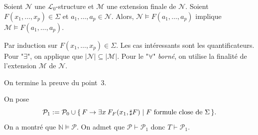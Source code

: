 \documentclass[./main]{subfiles}
\begin{document}
 \begin{lem}
   Soient $\mathcal{N}$ une $\mathcal{L}_0$-structure et $\mathcal{M}$ une extension finale de $\mathcal{N}$.
   Soient $F(x_1, \ldots, x_p) \in \Sigma$ et $a_1, \ldots, a_p \in \mathcal{N}$.
   Alors, $\mathcal{N} \models F(a_1, \ldots, a_p)$ implique $\mathcal{M} \models F(a_1, \ldots, a_p)$.
 \end{lem}
 \begin{prv}
   Par induction sur $F(x_1, \ldots, x_p) \in \Sigma$.
   Les cas intéressants sont les quantificateurs. Pour "$\exists$", on applique que $|\mathcal{N}| \subseteq |\mathcal{M}|$.
   Pour le "$\forall$" \textit{borné}, on utilise la finalité de l'extension $\mathcal{M}$ de $\mathcal{N}$.
 \end{prv}

 On termine la preuve du point~3.
 \vspace{7pt}

 \begin{prv}
   On pose \[
   \mathcal{P}_1 := \mathcal{P}_0 \cup \mleft\{\,F \to \exists x \: F_F(x_1, \sharp F) \;\middle|\; F \text{ formule close de } \Sigma\,\mright\}
   .\]
   On a montré que $\mathds{N} \models \mathcal{P}$.
   On admet que $\mathcal{P} \vdash \mathcal{P}_1$ donc $T \vdash \mathcal{P}_1$.
 \end{prv}
\end{document}
